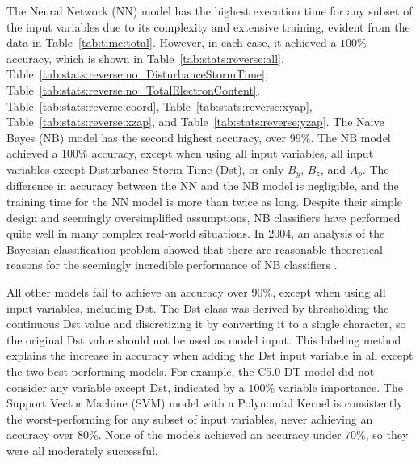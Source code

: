 \documentclass[sn-mathphys-num]{sn-jnl}%
\begin{document}
The Neural Network (NN) model has the highest execution time for any subset of the input variables due to its complexity and extensive training, evident from the data in Table~\ref{tab:time:total}. However, in each case, it achieved a $100\%$ accuracy, which is shown in Table~\ref{tab:stats:reverse:all}, Table~\ref{tab:stats:reverse:no_DisturbanceStormTime}, Table~\ref{tab:stats:reverse:no_TotalElectronContent}, Table~\ref{tab:stats:reverse:coord}, Table~\ref{tab:stats:reverse:xyap}, Table~\ref{tab:stats:reverse:xzap}, and Table~\ref{tab:stats:reverse:yzap}. The Naive Bayes (NB) model has the second highest accuracy, over $99\%$. The NB model achieved a $100\%$ accuracy, except when using all input variables, all input variables except Disturbance Storm-Time (Dst), or only $B_{y}$, $B_{z}$, and $A_{p}$. The difference in accuracy between the NN and the NB model is negligible, and the training time for the NN model is more than twice as long. Despite their simple design and seemingly oversimplified assumptions, NB classifiers have performed quite well in many complex real-world situations. In 2004, an analysis of the Bayesian classification problem showed that there are reasonable theoretical reasons for the seemingly incredible performance of NB classifiers \cite{Zhang2004}.

All other models fail to achieve an accuracy over $90\%$, except when using all input variables, including Dst. The Dst class was derived by thresholding the continuous Dst value and discretizing it by converting it to a single character, so the original Dst value should not be used as model input. This labeling method explains the increase in accuracy when adding the Dst input variable in all except the two best-performing models. For example, the C5.0 DT model did not consider any variable except Dst, indicated by a $100\%$ variable importance. The Support Vector Machine (SVM) model with a Polynomial Kernel is consistently the worst-performing for any subset of input variables, never achieving an accuracy over $80\%$. None of the models achieved an accuracy under $70\%$, so they were all moderately successful.
\end{document}
